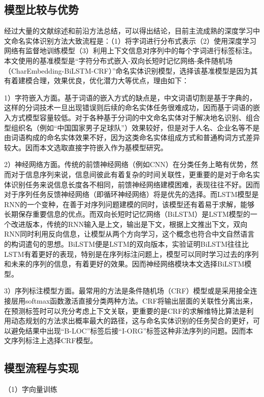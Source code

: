 \documentclass[winfonts,master,oneside,nobackinfo]{njuthesis}
\begin{document}
\subsection{模型比较与优势}
经过大量的文献综述和前沿方法总结，可以得出结论，目前主流成熟的深度学习中文命名实体识别方法大致流程是：（1）将字词进行分布式表示（2）使用深度学习网络有监督地训练模型（3）利用上下文信息对序列中的每个字词进行标签标注。本文使用的基准模型是“字符分布式嵌入-双向长短时记忆网络-条件随机场（CharEmbedding-BiLSTM-CRF）”命名实体识别模型，选择该基准模型是因为其有着建模合理，效果优良，优化潜力大等优点，理由如下：

1）字符嵌入方面。基于词语的嵌入方式的缺点是，中文词语切割是基于字典的，这样的分词技术一旦出现错误则后续的命名实体任务很难成功，因而基于词语的嵌入方式模型容量较低。对于各种基于分词的中文命名实体对于解决地名识别、组合型组织名（例如“中国国家男子足球队”）效果较好，但是对于人名、企业名等不是由词语构成的命名实体效果不好，因为这类命名实体组成方式和普通构词方式差异较大。因而本文选取直接字符嵌入作为基模型研究。

2）神经网络方面。传统的前馈神经网络（例如CNN）在分类任务上略有优势，然而对于信息序列来说，信息间彼此有着复杂的时间关联性，更重要的是对于命名实体识别任务来说信息长度各不相同，前馈神经网络建模困难，表现往往不好。因而对于序列任务反馈神经网络（即循环神经网络）将是优先的选择。而LSTM模型是RNN的一个变种，在善于对序列问题建模的同时，该模型还有着易于求解，能够长期保存重要信息的优点。而双向长短时记忆网络（BiLSTM）是LSTM模型的一个改进版本，传统的RNN输入是上文，输出是下文，根据上文推出下文，双向RNN同时利用反向信息，让模型从两个方向学习，这个概念也符合中文自然语言的构词遣句的思想。BiLSTM便是LSTM的双向版本，实验证明BiLSTM往往比LSTM有着更好的表现\cite{Graves}，特别是在序列标注问题上，模型可以同时学习过去的序列和未来的序列的信息，有着更好的效果\cite{Huang}。因而神经网络模块本文选择BiLSTM模型。

3）序列标注模型方面。最常用的方法是条件随机场（CRF）模型或是采用接全连接层用softmax函数激活直接分类两种方法。CRF将输出层面的关联性分离出来，在预测标签时可以充分考虑上下文关联，更重要的是CRF的求解维特比算法是利用动态规划的方法求出概率最大的路径，这与命名实体识别的任务契合的更好，可以避免结果中出现“B-LOC”标签后接“I-ORG”标签这种非法序列的问题。因而本文序列标注上选择CRF模型。

\subsection{模型流程与实现}

（1）字向量训练
\end{document}
